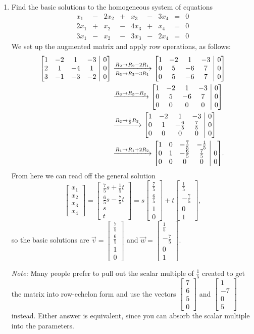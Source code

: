 \documentclass[12pt]{article}
\makeatletter
\newenvironment{amatrix}[1]{%
  \left[\begin{array}{@{}*{#1}{c}|c@{}}
}{%
  \end{array}\right]
}
\newcommand{\bbm}{\begin{bmatrix}}
\newcommand{\ebm}{\end{bmatrix}}
\newcommand{\bam}{\begin{amatrix}}
\newcommand{\eam}{\end{amatrix}}
\makeatother
\begin{document}
\begin{enumerate}
\item Find the basic solutions to the homogeneous system of equations
\[
 \begin{array}{ccccccccc}
  x_1&-&2x_2&+&x_3&-&3x_4&=&0\\
 2x_1&+&x_2&-&4x_3&+&x_4&=&0\\
 3x_1&-&x_2&-&3x_3&-&2x_4&=&0
 \end{array}
\]
We set up the augmented matrix and apply row operations, as follows:
\begin{align*}
 \bam{4}1&-2&1&-3&0\\2&1&-4&1&0\\3&-1&-3&-2&0\eam &\xrightarrow[R_3\to R_3-3R_1]{R_2\to R_2-2R_1} \bam{4}1&-2&1&-3&0\\0&5&-6&7&0\\0&5&-6&7&0\eam\\
&\xrightarrow{R_3\to R_3-R_2}\bam{4}1&-2&1&-3&0\\0&5&-6&7&0\\0&0&0&0&0\eam\\
&\xrightarrow{R_2\to \frac{1}{5}R_2}\bam{4}1&-2&1&-3&0\\0&1&-\frac{6}{5}&\frac{7}{5}&0\\0&0&0&0&0\eam\\
&\xrightarrow{R_1\to R_1+2R_2}\bam{4}1&0&-\frac{7}{5}&-\frac{1}{5}\\0&1&-\frac{6}{5}&\frac{7}{5}&0\\0&0&0&0&0\eam.
\end{align*}
From here we can read off the general solution
\[
 \bbm x_1\\x_2\\x_3\\x_4\ebm = \bbm \frac{7}{5}s+\frac{1}{5}t\\ \frac{6}{5}s-\frac{7}{5}t\\s\\t\ebm = s\bbm \frac{7}{5}\\\frac{6}{5}\\1\\0\ebm+t\bbm \frac{1}{5}\\-\frac{7}{5}\\0\\1\ebm,
\]
so the basic solutions are $\vec{v} = \bbm \frac{7}{5}\\\frac{6}{5}\\1\\0\ebm$ and $\vec{w} = \bbm \frac{1}{5}\\-\frac{7}{5}\\0\\1\ebm$.

\medskip

{\em Note:} Many people prefer to pull out the scalar multiple of $\frac{1}{5}$ created to get the matrix into row-echelon form and use the vectors $\bbm 7\\6\\5\\0\ebm$ and $\bbm 1\\-7\\0\\5\ebm$ instead. Either answer is equivalent, since you can absorb the scalar multiple into the parameters.


 \end{enumerate}
\end{document}

